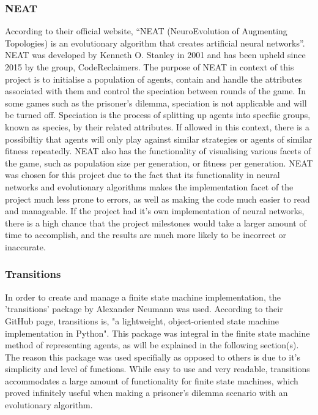 \documentclass[12pt,a4paper]{article}
\begin{document}
\subsubsection{NEAT}
According to their official website, “NEAT (NeuroEvolution of Augmenting Topologies) is an evolutionary algorithm that creates artificial neural networks”. NEAT was developed by Kenneth O. Stanley in 2001 and has been upheld since 2015 by the group, CodeReclaimers. The purpose of NEAT in context of this project is to initialise a population of agents, contain and handle the attributes associated with them and control the speciation between rounds of the game. In some games such as the prisoner's dilemma, speciation is not applicable and will be turned off. Speciation is the process of splitting up agents into specfiic groups, known as species, by their related attributes. If allowed in this context, there is a possibiltiy that agents will only play against similar strategies or agents of similar fitness repeatedly. NEAT also has the functionality of visualising various facets of the game, such as population size per generation, or fitness per generation. NEAT was chosen for this project due to the fact that its functionality in neural networks and evolutionary algorithms makes the implementation facet of the project much less prone to errors, as well as making the code much easier to read and manageable. If the project had it's own implementation of neural networks, there is a high chance that the project milestones would take a larger amount of time to accomplish, and the results are much more likely to be incorrect or inaccurate.

\subsubsection{Transitions}
In order to create and manage a finite state machine implementation, the 'transitions'\cite{45} package by Alexander Neumann was used. According to their GitHub page, transitions is, "a lightweight, object-oriented state machine implementation in Python". This package was integral in the finite state machine method of representing agents, as will be explained in the following section(s). The reason this package was used specifially as opposed to others is due to it's simplicity and level of functions. While easy to use and very readable, transitions accommodates a large amount of functionality for finite state machines, which proved infinitely useful when making a prisoner's dilemma scenario with an evolutionary algorithm.
\end{document}
